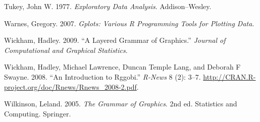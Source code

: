 \leavevmode\hypertarget{ref-tukey:1977}{}%
Tukey, John W. 1977. \emph{Exploratory Data Analysis}. Addison--Wesley.

\leavevmode\hypertarget{ref-gplots}{}%
Warnes, Gregory. 2007. \emph{Gplots: Various R Programming Tools for
Plotting Data}.

\leavevmode\hypertarget{ref-wickham:2007d}{}%
Wickham, Hadley. 2009. ``A Layered Grammar of Graphics.'' \emph{Journal
of Computational and Graphical Statistics}.

\leavevmode\hypertarget{ref-wickham:2008b}{}%
Wickham, Hadley, Michael Lawrence, Duncan Temple Lang, and Deborah F
Swayne. 2008. ``An Introduction to Rggobi.'' \emph{R-News} 8 (2): 3--7.
\url{http://CRAN.R-project.org/doc/Rnews/Rnews_2008-2.pdf}.

\leavevmode\hypertarget{ref-wilkinson:2006}{}%
Wilkinson, Leland. 2005. \emph{The Grammar of Graphics}. 2nd ed.
Statistics and Computing. Springer.
